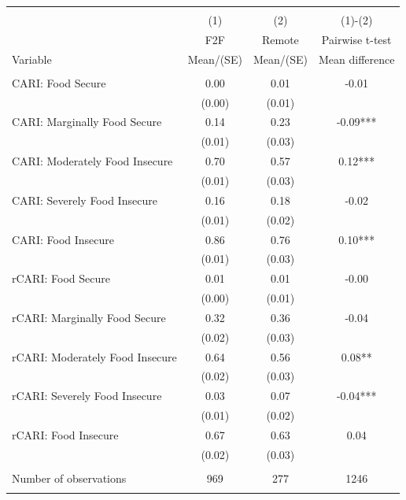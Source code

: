 
\begin{tabular}{@{\extracolsep{5pt}}lccc}
\\[-1.8ex]\hline \hline \\[-1.8ex]
 & \multicolumn{1}{c}{(1)}  & \multicolumn{1}{c}{(2)}  & \multicolumn{1}{c}{(1)-(2)} \\
 & \multicolumn{1}{c}{F2F}  & \multicolumn{1}{c}{Remote}  & \multicolumn{1}{c}{Pairwise t-test}  \\
Variable & Mean/(SE) & Mean/(SE) & Mean difference \\ \hline \\[-1.8ex] 
CARI: Food Secure   & 0.00    & 0.01    & -0.01   \\
 & (0.00)  & (0.01)  &  \\ [1ex]
CARI: Marginally Food Secure   & 0.14    & 0.23    & -0.09***   \\
 & (0.01)  & (0.03)  &  \\ [1ex]
CARI: Moderately Food Insecure   & 0.70    & 0.57    & 0.12***   \\
 & (0.01)  & (0.03)  &  \\ [1ex]
CARI: Severely Food Insecure   & 0.16    & 0.18    & -0.02   \\
 & (0.01)  & (0.02)  &  \\ [1ex]
CARI: Food Insecure   & 0.86    & 0.76    & 0.10***   \\
 & (0.01)  & (0.03)  &  \\ [1ex]
rCARI: Food Secure   & 0.01    & 0.01    & -0.00   \\
 & (0.00)  & (0.01)  &  \\ [1ex]
rCARI: Marginally Food Secure   & 0.32    & 0.36    & -0.04   \\
 & (0.02)  & (0.03)  &  \\ [1ex]
rCARI: Moderately Food Insecure   & 0.64    & 0.56    & 0.08**   \\
 & (0.02)  & (0.03)  &  \\ [1ex]
rCARI: Severely Food Insecure   & 0.03    & 0.07    & -0.04***   \\
 & (0.01)  & (0.02)  &  \\ [1ex]
rCARI: Food Insecure   & 0.67    & 0.63    & 0.04   \\
 & (0.02)  & (0.03)  &  \\ [1ex]
\hline \\[-1.8ex]
Number of observations  & 969   & 277  & 1246  \\
\hline \hline \\[-1.8ex]

\end{tabular}
